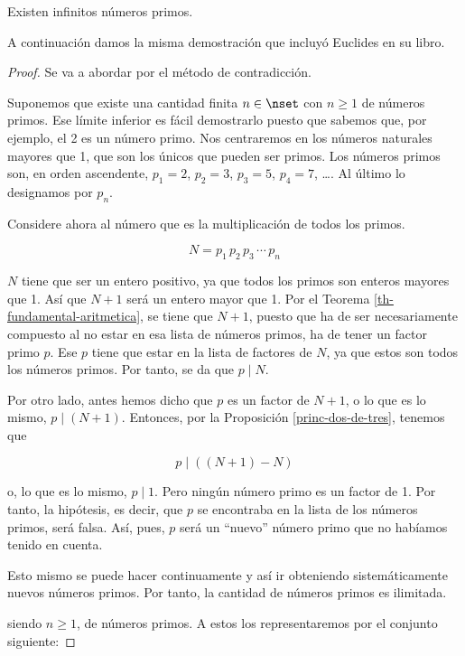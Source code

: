 \begin{theorem}
  Existen infinitos números primos.
\end{theorem}

A continuación damos la misma demostración que incluyó Euclides en su libro.

\begin{proof}
  Se va a abordar por el método de contradicción.

  Suponemos que existe una cantidad finita $n \in \nset$ con $n \geq 1$ de
  números primos. Ese límite inferior es fácil demostrarlo puesto que
  sabemos que, por ejemplo, el 2 es un número primo. Nos centraremos en los
  números naturales mayores que 1, que son los únicos que pueden ser primos.
  Los números primos son, en orden ascendente, $p_1 = 2$, $p_2 = 3$, $p_3 =
  5$, $p_4 = 7$, \ldots. Al último lo designamos por $p_n$.

  Considere ahora al número que es la multiplicación de todos los primos.

  $$ N = p_1 \, p_2 \, p_3 \, \cdots \, p_n $$

  $N$ tiene que ser un entero positivo, ya que todos los primos son enteros
  mayores que 1. Así que $N+1$ será un entero mayor que 1. Por el Teorema
  \ref{th-fundamental-aritmetica}, se tiene que $N+1$, puesto que ha de ser
  necesariamente compuesto al no estar en esa lista de números primos, ha de
  tener un factor primo $p$. Ese $p$ tiene que estar en la lista de factores
  de $N$, ya que estos son todos los números primos. Por tanto, se da que $p
  \mid N$.

  Por otro lado, antes hemos dicho que $p$ es un factor de $N+1$, o lo que
  es lo mismo, $p \mid (N+1)$. Entonces, por la Proposición
  \ref{princ-dos-de-tres}, tenemos que

  $$ p \mid ((N+1) - N) $$

  \noindent o, lo que es lo mismo, $p \mid 1$. Pero ningún número primo es
  un factor de 1. Por tanto, la hipótesis, es decir, que $p$ se encontraba
  en la lista de los números primos, será falsa. Así, pues, $p$ será un
  ``nuevo'' número primo que no habíamos tenido en cuenta.

  Esto mismo se puede hacer continuamente y así ir obteniendo
  sistemáticamente nuevos números primos. Por tanto, la cantidad de números
  primos es ilimitada.

  \iffalse
  siendo $n \geq 1$, de números primos. A estos los representaremos por el
  conjunto siguiente:


\end{proof}
